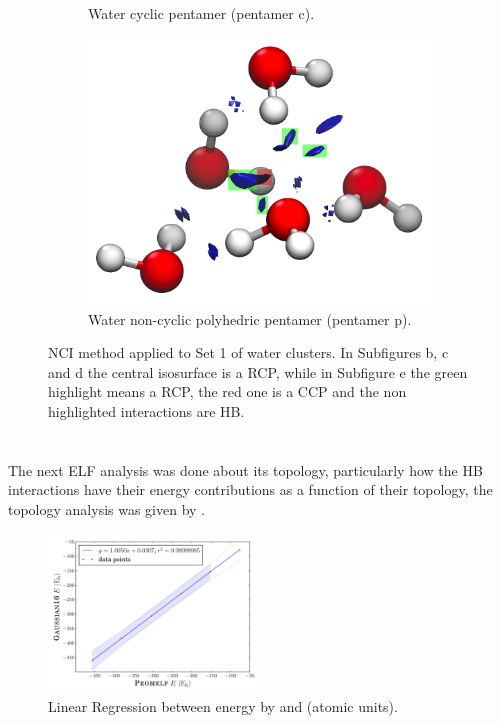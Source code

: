 \begin{figure}[h!]
\begin{subfigure}[b]{0.4\linewidth}
    \caption{Water cyclic pentamer (pentamer c).}
    \label{penta_c_nci}
  \end{subfigure}
  \begin{subfigure}[b]{0.4\linewidth}
    \includegraphics[width=\linewidth]{4/plots/nci/new/pentamer_pNCI}
    \caption{Water non-cyclic polyhedric pentamer (pentamer p).}
    \label{penta_p_nci}
  \end{subfigure}
  \caption{NCI method applied to Set 1 of water clusters. In Subfigures b, c and d the central isosurface is a RCP, while in
  Subfigure e the
  green highlight means a RCP, the red one is a CCP and the non highlighted interactions are HB.}
  \label{NCI}
\end{figure}


\clearpage

\section{{}}

The next ELF analysis was done about its topology,
particularly how the HB interactions have their energy contributions as a function of their topology,
the topology analysis was given by {}.

\begin{figure}
    \centering
    \includegraphics[width=0.5\textwidth]{4/plots/promelf/wfn_vs_promelf.pdf}
    \caption{Linear Regression between energy by {} and {} (atomic units).}
\label{rl_wfn}
\end{figure}

